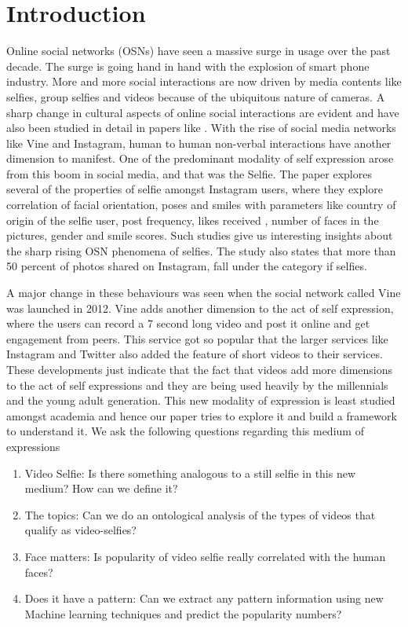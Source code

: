 \section{Introduction}
Online social networks (OSNs) have seen a massive surge in usage over the past decade. The surge is going hand in hand with the explosion of smart phone industry. More and more social interactions are now driven by media contents like selfies, group selfies and videos because of the ubiquitous nature of cameras. A sharp change in cultural aspects of online social interactions are evident and have also been studied in detail in papers like \cite{Souza2015}. 
With the rise of social media networks like Vine and Instagram, human to human non-verbal interactions have another dimension to manifest. One of the predominant modality of self expression arose from this boom in social media, and that was the Selfie. The \cite{Souza2015} paper explores several of the properties of selfie amongst Instagram users, where they explore correlation of facial orientation, poses and smiles with parameters like country of origin of the selfie user, post frequency, likes received , number of faces in the pictures, gender and smile scores. Such studies give us interesting insights about the sharp rising OSN phenomena of selfies. The study also states that more than 50 percent of photos shared on Instagram, fall under the category if selfies. 
\par
A major change in these behaviours was seen when the social network called Vine was launched in 2012. Vine adds another dimension to the act of self expression, where the users can record a 7 second long video and post it online and get engagement from peers. This service got so popular that the larger services like Instagram and Twitter also added the feature of short videos to their services. These developments just indicate that the fact that videos add more dimensions to the act of self expressions and they are being used heavily by the millennials and the young adult generation. This new modality of expression is least studied amongst academia and hence our paper tries to explore it and build a framework to understand it. We ask the following questions regarding this medium of expressions

\begin{enumerate}
\item Video Selfie: Is there something analogous to a still selfie in this new medium? How can we define it?
\item The topics: Can we do an ontological analysis of the types of videos that qualify as video-selfies? 
\item Face matters: Is popularity of video selfie really correlated with the human faces? 
\item Does it have a pattern: Can we extract any pattern information using new Machine learning techniques and predict the popularity numbers? 
\end{enumerate}


